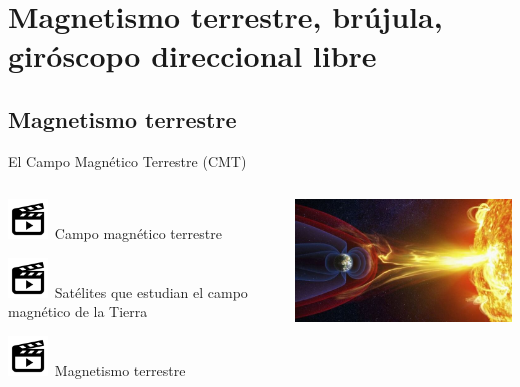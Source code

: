 
\section{Magnetismo terrestre, br\'ujula, gir\'oscopo direccional libre}
\label{sec:magnetismo.terrestre}


\subsection{Magnetismo terrestre}
\label{sec:magnetismo.terrestre.basico}

\begin{frame}{El Campo Magn\'etico Terrestre (CMT)}
  \begin{columns}
    \begin{column}{0.3\textwidth}
  \href{https://www.youtube.com/watch?v=5qDI3O-aKiw}{\includegraphics[width=0.15\textwidth]{05.IyA.imagenes/Video.png}}\, Campo magn\'etico terrestre

  \href{https://www.youtube.com/watch?v=UujmN0cZlSw}{\includegraphics[width=0.15\textwidth]{05.IyA.imagenes/Video.png}}\, Sat\'elites que estudian el campo magn\'etico de la Tierra

    \href{https://www.youtube.com/watch?v=DwshhZq6T8Q}{\includegraphics[width=0.15\textwidth]{05.IyA.imagenes/Video.png}}\, Magnetismo terrestre
  \end{column}
  \begin{column}{0.7\textwidth}
    \includegraphics[width=\textwidth]{05.instrumentos.giroscopicos.imagenes/05.04.MagnetismoTerrestre/05-04-campo-magnetico-terrestre.jpg}\vspace{3mm}


\end{column}
\end{columns}
\end{frame}
